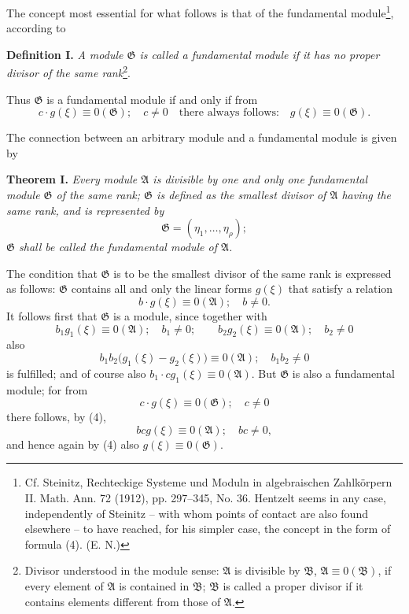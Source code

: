 \documentclass[11pt]{article}
\providecommand{\Amod}{\mathfrak A}
\providecommand{\Bmod}{\mathfrak B}
\providecommand{\Gmod}{\mathfrak G}
\providecommand{\zero}[1]{\equiv 0(#1)}
\providecommand{\Amod}{\mathfrak A}
\providecommand{\Bmod}{\mathfrak B}
\providecommand{\Gmod}{\mathfrak G}
\providecommand{\zero}[1]{\equiv 0\pmod{#1}}
\begin{document}
The concept most essential for what follows is that of the fundamental module\footnote{Cf. Steinitz, Rechteckige Systeme und Moduln in algebraischen Zahlkörpern II. Math. Ann. 72 (1912), pp. 297--345, No. 36. Hentzelt seems in any case, independently of Steinitz -- with whom points of contact are also found elsewhere -- to have reached, for his simpler case, the concept in the form of formula (4). (E. N.)}, according to

\medskip
\noindent\textbf{Definition I.} \emph{A module $\Gmod$ is called a fundamental module if it has no proper divisor of the same rank}\footnote{Divisor understood in the module sense: $\Amod$ is divisible by $\Bmod$, $\Amod\zero{\Bmod}$, if every element of $\Amod$ is contained in $\Bmod$; $\Bmod$ is called a proper divisor if it contains elements different from those of $\Amod$.}.

Thus $\Gmod$ is a fundamental module if and only if from
\begin{equation}
 c\cdot g(\xi)\zero{\Gmod};\quad c\ne0 \quad\text{there always follows:}\quad g(\xi)\zero{\Gmod}.
\tag{2}
\end{equation}

The connection between an arbitrary module and a fundamental module is given by

\medskip
\noindent\textbf{Theorem I.} \emph{Every module $\Amod$ is divisible by one and only one fundamental module $\Gmod$ of the same rank; $\Gmod$ is defined as the smallest divisor of $\Amod$ having the same rank, and is represented by}
\begin{equation}
 \Gmod=(\eta_1,\ldots,\eta_\rho);
\tag{3}
\end{equation}
\emph{$\Gmod$ shall be called the fundamental module of $\Amod$.}

The condition that $\Gmod$ is to be the smallest divisor of the same rank is expressed as follows: $\Gmod$ contains all and only the linear forms $g(\xi)$ that satisfy a relation
\begin{equation}
 b\cdot g(\xi)\zero{\Amod};\quad b\ne0.
\tag{4}
\end{equation}
It follows first that $\Gmod$ is a module, since together with
\[
 b_1g_1(\xi)\zero{\Amod};\quad b_1\ne0;
 \qquad
 b_2g_2(\xi)\zero{\Amod};\quad b_2\ne0
\]
also
\[
 b_1b_2\bigl(g_1(\xi)-g_2(\xi)\bigr)\zero{\Amod};\quad b_1b_2\ne0
\]
is fulfilled; and of course also $b_1\cdot c g_1(\xi)\zero{\Amod}$. But $\Gmod$ is also a fundamental module; for from
\[
 c\cdot g(\xi)\zero{\Gmod};\quad c\ne0
\]
there follows, by (4),
\[
 b c g(\xi)\zero{\Amod};\quad bc\ne0,
\]
and hence again by (4) also $g(\xi)\zero{\Gmod}$.
\end{document}
